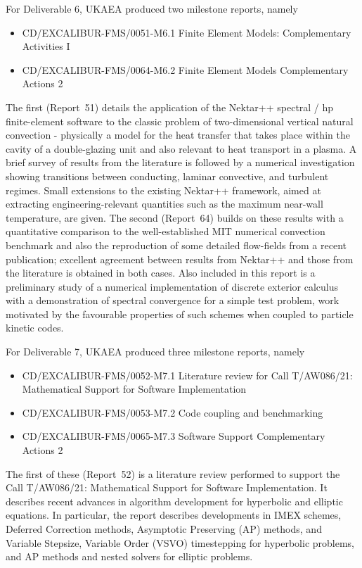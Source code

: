 For Deliverable 6, UKAEA produced two milestone reports, namely 
\begin{itemize}
\item CD/EXCALIBUR-FMS/0051-M6.1   Finite Element Models: Complementary Activities I 
\item CD/EXCALIBUR-FMS/0064-M6.2   Finite Element Models Complementary Actions 2 
\end{itemize}
The first (Report~51)  details the application of the Nektar++ spectral / hp finite-element software to the classic problem 
of two-dimensional vertical natural convection - physically a model for the heat transfer that takes place within the 
cavity of a double-glazing unit and also relevant to heat transport in a plasma.  A brief survey of results from the 
literature is followed by a numerical investigation showing transitions between conducting, laminar convective, and 
turbulent regimes.  Small extensions to the existing Nektar++ framework, aimed at extracting engineering-relevant 
quantities such as the maximum near-wall temperature, are given.  The second (Report~64)  builds on these results with a 
quantitative comparison to the well-established MIT numerical convection benchmark and also the reproduction of some 
detailed flow-fields from a recent publication; excellent agreement between results from Nektar++ and those from the 
literature is obtained in both cases.  Also included in this report is a preliminary study of a numerical 
implementation of discrete exterior calculus with a demonstration of spectral convergence for a simple test problem, 
work motivated by the favourable properties of such schemes when coupled to particle kinetic codes.

For Deliverable 7, UKAEA produced three milestone reports, namely 
\begin{itemize}
\item CD/EXCALIBUR-FMS/0052-M7.1   Literature review for Call T/AW086/21: Mathematical Support for Software Implementation 
\item CD/EXCALIBUR-FMS/0053-M7.2   Code coupling and benchmarking 
\item CD/EXCALIBUR-FMS/0065-M7.3   Software Support Complementary Actions 2 
\end{itemize}
The first of these (Report~52)  is a literature review performed to support the Call T/AW086/21: Mathematical Support for 
Software Implementation. It describes recent advances in algorithm development for hyperbolic and elliptic equations.  
In particular, the report describes developments in IMEX schemes, Deferred Correction methods, Asymptotic Preserving 
(AP) methods, and Variable Stepsize, Variable Order (VSVO) timestepping for hyperbolic problems, and AP methods and 
nested solvers for elliptic problems.

